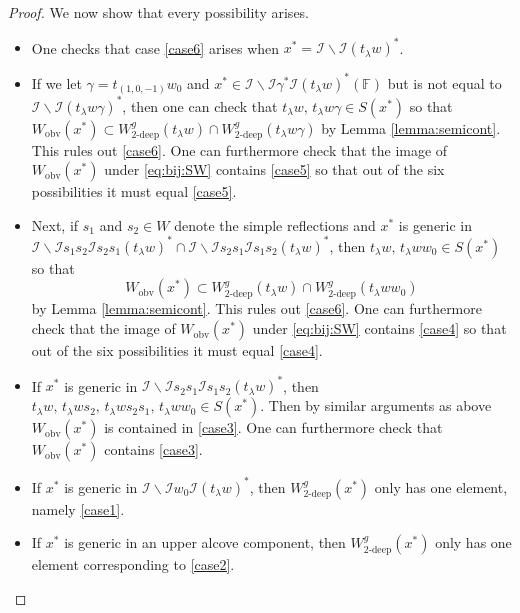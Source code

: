 \documentclass[oneside,a4paper,english, 11pt]{amsart}
\theoremstyle{plain}
\theoremstyle{plain}
\theoremstyle{plain}
\theoremstyle{plain}
\theoremstyle{plain}
\theoremstyle{plain}
\theoremstyle{definition}
\theoremstyle{definition}
\theoremstyle{definition}
\theoremstyle{remark}
\numberwithin{equation}{section}
\newcommand{\F}{\mathbb{F}}
\newcommand{\cI}{\mathcal{I}}
\begin{document}
\begin{proof}
We now show that every possibility arises. 
\begin{itemize}
\item 
One checks that case \eqref{case6} arises when $x^* = \cI\backslash \cI (t_\lambda w)^*$. 
\item 
If we let $\gamma = t_{(1,0,-1)} w_0$ and $x^* \in \cI\backslash \cI \gamma^* \cI (t_\lambda w)^* (\F)$ but is not equal to $\cI\backslash \cI (t_\lambda w\gamma)^*$, then one can check that $t_\lambda w, \, t_\lambda w \gamma \in S(x^*)$ so that $W_{\mathrm{obv}}(x^*) \subset W^g_{2\textrm{-deep}}(t_\lambda w) \cap W^g_{2\textrm{-deep}}(t_\lambda w \gamma)$ by Lemma \ref{lemma:semicont}. 
This rules out \eqref{case6}. 
One can furthermore check that the image of $W_{\mathrm{obv}}(x^*)$ under \eqref{eq:bij:SW} contains \eqref{case5} so that out of the six possibilities it must equal \eqref{case5}. 
\item 
Next, if $s_1$ and $s_2 \in W$ denote the simple reflections and $x^*$ is generic in $\cI\backslash \cI s_1 s_2 \cI s_2 s_1 (t_\lambda w)^* \cap \cI\backslash \cI s_2 s_1 \cI s_1 s_2 (t_\lambda w)^*$, then $t_\lambda w, \, t_\lambda w w_0 \in S(x^*)$ so that $$W_{\mathrm{obv}}(x^*) \subset W^g_{2\textrm{-deep}}(t_\lambda w) \cap W^g_{2\textrm{-deep}}(t_\lambda w w_0)$$ by Lemma \ref{lemma:semicont}. 
This rules out \eqref{case6}. 
One can furthermore check that the image of $W_{\mathrm{obv}}(x^*)$ under \eqref{eq:bij:SW} contains \eqref{case4} so that out of the six possibilities it must equal \eqref{case4}. 
\item 
If $x^*$ is generic in $\cI\backslash \cI s_2 s_1 \cI s_1 s_2 (t_\lambda w)^*$, then $t_\lambda w, \, t_\lambda w s_2,\, t_\lambda w s_2s_1, \, t_\lambda w w_0 \in S(x^*)$. 
Then by similar arguments as above $W_{\mathrm{obv}}(x^*)$ is contained in \eqref{case3}. 
One can furthermore check that $W_{\mathrm{obv}}(x^*)$ contains \eqref{case3}. 
\item 
If $x^*$ is generic in $\cI\backslash \cI w_0 \cI (t_\lambda w)^*$, then $W^g_{2\textrm{-deep}}(x^*)$ only has one element, namely \eqref{case1}. 
\item If $x^*$ is generic in an upper alcove component, then $W^g_{2\textrm{-deep}}(x^*)$ only has one element corresponding to \eqref{case2}. 
\end{itemize}
\end{proof}
\end{document}
